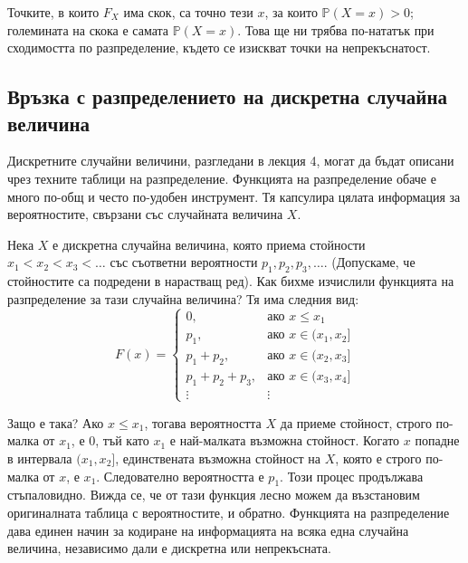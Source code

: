 Точките, в които $F_X$ има скок, са точно тези $x$, за които $\mathbb{P}(X = x) > 0$;
големината на скока е самата $\mathbb{P}(X = x)$. Това ще ни трябва по-нататък при
сходимостта по разпределение, където се изискват точки на непрекъснатост.

\subsection{Връзка с разпределението на дискретна случайна величина}

Дискретните случайни величини, разгледани в лекция 4, могат да бъдат описани чрез техните таблици на разпределение. Функцията на разпределение обаче е много по-общ и често по-удобен инструмент. Тя капсулира цялата информация за вероятностите, свързани със случайната величина $X$.

Нека $X$ е дискретна случайна величина, която приема стойности $x_1 < x_2 < x_3 < \dots$ със съответни вероятности $p_1, p_2, p_3, \dots$. (Допускаме, че стойностите са подредени в нарастващ ред).
Как бихме изчислили функцията на разпределение за тази случайна величина?
Тя има следния вид:
\[
F(x) =
\begin{cases}
0, & \text{ако } x \le x_1 \\
p_1, & \text{ако } x \in (x_1, x_2] \\
p_1 + p_2, & \text{ако } x \in (x_2, x_3] \\
p_1 + p_2 + p_3, & \text{ако } x \in (x_3, x_4] \\
\vdots & \vdots
\end{cases}
\]

Защо е така? Ако $x \le x_1$, тогава вероятността $X$ да приеме стойност, строго по-малка от $x_1$, е 0, тъй като $x_1$ е най-малката възможна стойност. Когато $x$ попадне в интервала $(x_1, x_2]$, единствената възможна стойност на $X$, която е строго по-малка от $x$, е $x_1$. Следователно вероятността е $p_1$. Този процес продължава стъпаловидно. Вижда се, че от тази функция лесно можем да възстановим оригиналната таблица с вероятностите, и обратно. Функцията на разпределение дава единен начин за кодиране на информацията на всяка една случайна величина, независимо дали е дискретна или непрекъсната.

